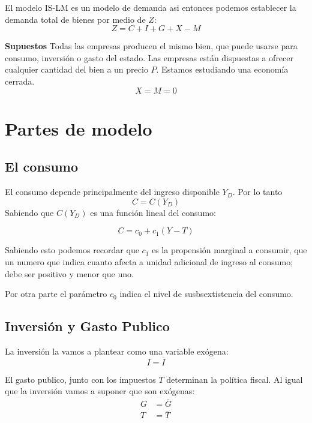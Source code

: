 
El modelo IS-LM es un modelo de demanda asi entonces podemos establecer la demanda total de bienes por medio de $Z$:
\begin{equation}
    Z= C+I+G+X-M
\end{equation}

\textbf{Supuestos}
Todas las empresas producen el mismo bien, que puede usarse para consumo, inversión o gasto del estado. Las empresas están dispuestas a ofrecer cualquier cantidad del bien a un precio $P$. Estamos estudiando una economía cerrada.
$$X=M=0$$
\section{Partes de modelo}
\subsection{El consumo}
El consumo depende principalmente del ingreso disponible $Y_{D}$. Por lo tanto
\begin{equation}
    C=C(Y_{D})
\end{equation}
Sabiendo que $C(Y_{D})$ es una función lineal del consumo:

\begin{equation*}
    C = c_{0} + c_{1}(Y-T)
\end{equation*}

Sabiendo esto podemos recordar que $c_{1}$ es la propensión marginal a consumir, que un numero que indica cuanto afecta a unidad adicional de ingreso al consumo; debe ser positivo y menor que uno.

Por otra parte el parámetro $c_{0}$ indica el nivel de susbsextistencia del consumo.

\subsection{Inversión y Gasto Publico}

La inversión la vamos a plantear como una variable exógena:
\begin{equation}
    I=\overline{I}
\end{equation}


El gasto publico, junto con los impuestos $T$ determinan la política fiscal. Al igual que la inversión vamos a suponer que son exógenas:
\begin{align}
    G & =\overline{G}\\
    T &= \overline{T}
\end{align}

